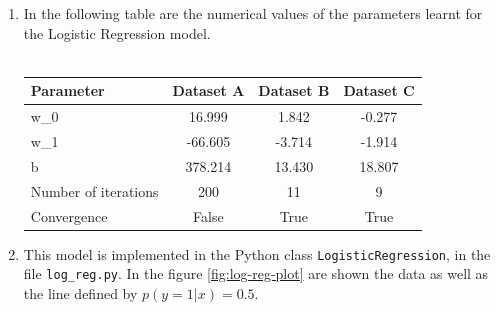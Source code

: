 \documentclass[a4paper, 11pt]{report}
\begin{document}
\begin{enumerate}[label=\alph*]
    \item In the following table are the numerical values of the parameters learnt for the Logistic Regression model. \\
    \\
        \begin{tabular}{ | l || *{3}{c| } }
             \hline
                Parameter & Dataset A & Dataset B & Dataset C \\
             \hline			
               w_0 & 16.999 & 1.842 & -0.277 \\
               w_1 & -66.605 & -3.714 & -1.914 \\
               b & 378.214 & 13.430 & 18.807 \\
            \hline
               Number of iterations & 200 & 11 & 9 \\
               Convergence & False & True & True \\
             \hline  
         \end{tabular}
    
    \item This model is implemented in the Python class \texttt{LogisticRegression}, in the file \texttt{log\_reg.py}. In the figure \ref{fig:log-reg-plot} are shown the data as well as the line defined by $p \left( y=1 | x \right) = 0.5$.
    

\end{enumerate}
\end{document}

